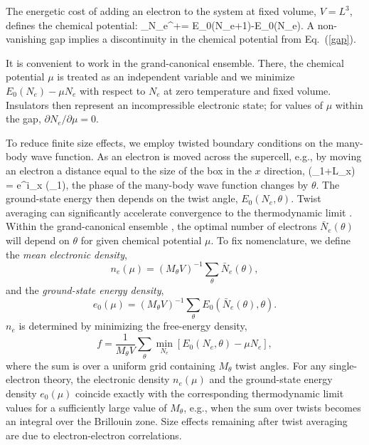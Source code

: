 The energetic cost of adding an electron to the system at fixed volume, $V=L^3$, defines the
chemical potential:
\beq
\mu_{N_e}^+= E_0(N_e+1)-E_0(N_e).
\eeq
A non-vanishing gap implies a discontinuity in the chemical potential from Eq.~(\ref{gap}).

It is convenient to work in the grand-canonical ensemble. There, the
chemical potential $\mu$ is treated as an independent variable and we minimize $E_0(N_e)-\mu N_e$ with respect to $N_e$ at zero temperature and fixed volume. Insulators then represent an incompressible electronic state; for values of $\mu$
within the gap, $\partial N_e/\partial \mu=0$.

To reduce finite size effects, we employ twisted boundary conditions on the many-body wave function.
As an electron is moved across the supercell, e.g., by moving an electron a distance equal to the size of the box in the $x$ direction,
\beq
\Psi (\rvec_1+L_x) = e^{i\theta_x} \Psi(\rvec_1),
\eeq
the phase of the many-body wave function changes by $\theta$.
The ground-state energy then depends on the twist angle, $E_0(N_e,\theta)$. 
Twist averaging
can significantly accelerate convergence 
to the thermodynamic limit \cite{Lin01}.
Within the grand-canonical ensemble \cite{fse,finitesize}, the optimal number
of electrons ${\bar N}_e(\theta)$ will depend  on $\theta$ for given chemical potential $\mu$. To fix nomenclature, we define the
\emph{mean electronic density},
\begin{equation} \label{eq:ne}
n_e(\mu)=(M_\theta V)^{-1}\sum_\theta  {\bar N}_e(\theta),
\end{equation}
and the \emph{ground-state energy density},
\begin{equation} \label{eq:e0}
e_0(\mu)=(M_\theta V)^{-1} \sum_\theta E_0({\bar N}_e(\theta),\theta).
\end{equation}
$n_e$ is determined by minimizing the free-energy density,
\begin{equation}
f=\frac{1}{M_\theta V} \sum_\theta \min_{N_e} \left[ E_0(N_e,\theta) - \mu N_e \right],
\end{equation}
where the sum is over a uniform grid containing $M_\theta$ twist angles.
For any single-electron theory, the electronic density $n_e(\mu)$
and the ground-state energy density $e_0(\mu)$ coincide exactly with the corresponding
thermodynamic limit values for a sufficiently large value of $M_\theta$, e.g., when the sum over twists becomes an integral over the 
Brillouin zone.  Size effects remaining after twist averaging are due to electron-electron correlations.

